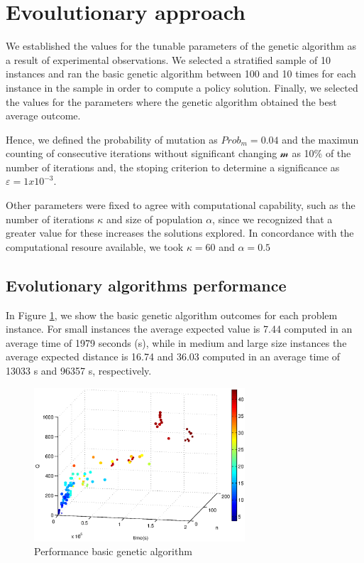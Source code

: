 \section{Evoulutionary approach}

We established the values for the tunable parameters of the genetic algorithm as a result of experimental observations. We selected a stratified sample of 10 instances and ran the basic genetic algorithm between 100 and 10 times for each instance in the sample in order to compute a policy solution. Finally, we selected the values for the parameters where the genetic algorithm obtained the best average outcome.

Hence, we defined the probability of mutation as $Prob_m = 0.04$ and the maximun counting of consecutive iterations without significant changing $\mathcal{m}$ as 10\% of the number of iterations and, the stoping criterion to determine a significance as $\varepsilon = 1x10^{-3}$.

Other parameters were fixed to agree with computational capability, such as the number of iterations $\kappa$ and size of population $\alpha$, since we recognized that a greater value for these increases the solutions explored. In concordance with the computational resoure available, we took $\kappa = 60$ and $\alpha = 0.5$


\subsection{Evolutionary algorithms performance}

In Figure \ref{fig:compare_expected_distance_ga}, we show the basic genetic algorithm outcomes for each problem instance.  For small instances the average expected value is 7.44 computed in an average time of 1979 seconds (s), while in medium and large size instances the average expected distance is 16.74 and 36.03 computed in an average time of 13033 s and 96357 s, respectively.


\begin{figure}[!htbp]
  \begin{center}
   \includegraphics[width=0.7\textwidth]{Images/Chapter5/compare_expected_distance_ga.eps}
  \end{center}
    \caption{Performance basic genetic algorithm}\label{fig:compare_expected_distance_ga}
\end{figure}


